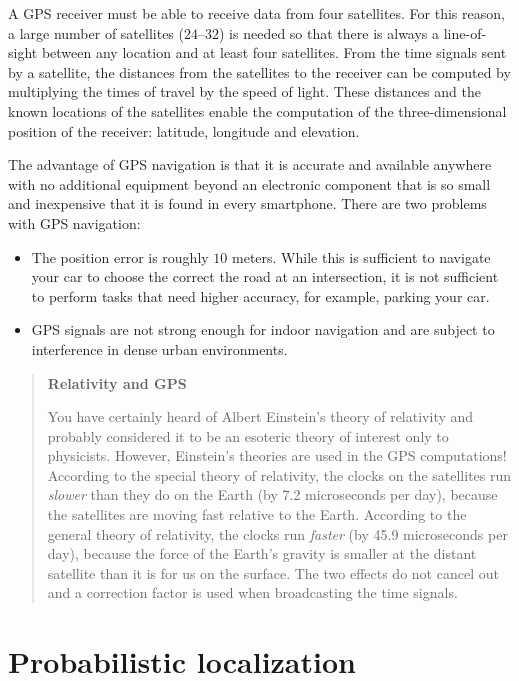 A GPS receiver must be able to receive data from four satellites. For this reason, a large number of satellites ($24$--$32$) is needed so that there is always a line-of-sight between any location and at least four satellites. From the time signals sent by a satellite, the distances from the satellites to the receiver can be computed by multiplying the times of travel by the speed of light. These distances and the known locations of the satellites enable the computation of the three-dimensional position of the receiver: latitude, longitude and elevation.

The advantage of GPS navigation is that it is accurate and available anywhere with no additional equipment beyond an electronic component that is so small and inexpensive that it is found in every smartphone. There are two problems with GPS navigation:
\begin{itemize}
\item The position error is roughly $10$ meters. While this is sufficient to navigate your car to choose the correct the road at an intersection, it is not sufficient to perform tasks that need higher accuracy, for example, parking your car.
\item GPS signals are not strong enough for indoor navigation and are subject to interference in dense urban environments.
\end{itemize}

\begin{quote}
\begin{center}
\textbf{Relativity and GPS}
\end{center}
You have certainly heard of Albert Einstein's theory of relativity and probably considered it to be an esoteric theory of interest only to physicists. However, Einstein's theories are used in the GPS computations! According to the special theory of relativity, the clocks on the satellites run \emph{slower} than they do on the Earth (by 7.2 microseconds per day), because the satellites are moving fast relative to the Earth. According to the general theory of relativity, the clocks run \emph{faster} (by 45.9 microseconds per day), because the force of the Earth's gravity is smaller at the distant satellite than it is for us on the surface. The two effects do not cancel out and a correction factor is used when broadcasting the time signals.
\end{quote}

\section{Probabilistic localization}\label{s.prob-local}


